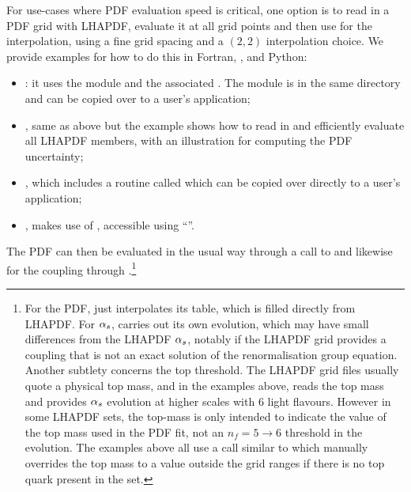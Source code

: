 For use-cases where PDF evaluation speed is critical, one option is
to read in a PDF grid with LHAPDF, evaluate it at all \hoppet grid points and
then use \hoppet for the interpolation, using a fine grid spacing and
a $(2,2)$ interpolation choice.
%
We provide examples for how to do this in Fortran, \CPP, and Python:
\begin{itemize}
 \item {}: it
   uses the module  and the associated
   . The module is in the same
   directory and can be copied over to a user's application;
 \item
   ,
   same as above but the example shows how to read in and efficiently
   evaluate all
   LHAPDF members, with an illustration for computing the PDF uncertainty;
 \item {}, which
   includes a routine called  which can be  copied over directly to a
   user's application;
 \item {}, makes use
   of , accessible using ``''.
\end{itemize}
%
%
%
The PDF can then be evaluated in the usual
way through a call to  and likewise for the coupling
through .\footnote{%
  For the PDF, \hoppet just
  interpolates its table, which is filled directly from LHAPDF.
  For $\alpha_s$, \hoppet carries out its own evolution, which may have
  small differences from the LHAPDF $\alpha_s$, notably if the LHAPDF grid
  provides a coupling that is not an exact solution of the renormalisation
  group equation.
  Another subtlety concerns the top threshold.
  The LHAPDF grid files usually quote a physical top mass, and in the
  examples above, \hoppet reads the top mass and provides $\alpha_s$
  evolution at higher scales with $6$ light flavours.
  However in some LHAPDF sets, the top-mass is only intended to
  indicate the value of the top mass used in the PDF fit, not an $n_f = 5
  \to 6$ threshold in the evolution.
  The examples above all use a call similar to
   which manually overrides
  the top mass to a value outside the grid ranges if there is no top
  quark present in the set.
}
